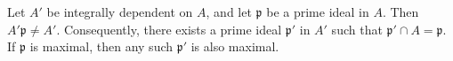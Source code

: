 Let $A'$ be integrally dependent on $A$, and let $\mathfrak{p}$ be a prime ideal in $A$. Then $A'\mathfrak{p} \neq A'$. Consequently, there exists a prime ideal $\mathfrak{p}'$ in $A'$ such that $\mathfrak{p}' \cap A = \mathfrak{p}$. If $\mathfrak{p}$ is maximal, then any such $\mathfrak{p}'$ is also maximal.
